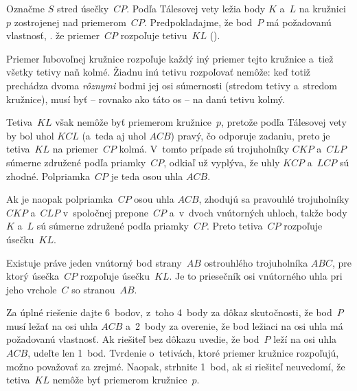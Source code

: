 {%
Označme $S$ stred úsečky~$CP$. Podľa Tálesovej vety ležia body $K$ a~$L$ na kružnici~$p$ zostrojenej nad priemerom~$CP$. Predpokladajme, že bod~$P$ má požadovanú vlastnosť, \tj. že priemer~$CP$ rozpoľuje tetivu~$KL$ (\obr).
%

Priemer ľubovoľnej kružnice rozpoľuje každý iný priemer tejto kružnice a~tiež všetky tetivy naň kolmé. Žiadnu inú tetivu rozpoľovať nemôže: keď totiž prechádza dvoma {\it rôznymi} bodmi jej osi súmernosti (stredom tetivy a~stredom kružnice), musí byť -- rovnako ako táto os -- na danú tetivu kolmý.

Tetiva~$KL$ však nemôže byť priemerom kružnice~$p$, pretože podľa Tálesovej vety by bol uhol $KCL$ (a~teda aj uhol $ACB$) pravý, čo odporuje zadaniu, preto je tetiva~$KL$ na priemer~$CP$ kolmá. V~tomto prípade sú trojuholníky $CKP$ a~$CLP$ súmerne združené podľa priamky~$CP$, odkiaľ už vyplýva, že uhly $KCP$ a~$LCP$ sú zhodné. Polpriamka~$CP$ je teda osou uhla $ACB$.

Ak je naopak polpriamka~$CP$ osou uhla $ACB$, zhodujú sa pravouhlé trojuholníky $CKP$ a~$CLP$ v~spoločnej prepone~$CP$ a~v~dvoch vnútorných uhloch, takže body $K$ a~$L$ sú súmerne združené podľa priamky~$CP$. Preto tetiva~$CP$ rozpoľuje úsečku~$KL$.

\odpoved
Existuje práve jeden vnútorný bod strany~$AB$ ostrouhlého trojuholníka $ABC$, pre ktorý úsečka~$CP$ rozpoľuje úsečku~$KL$. Je to priesečník osi vnútorného uhla pri jeho vrchole~$C$ so stranou~$AB$.

\nobreak\medskip\petit\noindent
Za úplné riešenie dajte 6~bodov, z~toho 4~body za dôkaz skutočnosti, že bod~$P$ musí ležať na osi uhla $ACB$ a~2~body za overenie, že bod ležiaci na osi uhla má požadovanú vlastnosť. Ak riešiteľ bez dôkazu uvedie, že bod~$P$ leží na osi uhla $ACB$, udeľte len 1~bod. Tvrdenie o~tetivách, ktoré priemer kružnice rozpoľujú, možno považovať za zrejmé. Naopak, strhnite 1~bod, ak si riešiteľ neuvedomí, že tetiva~$KL$ nemôže byť priemerom kružnice~$p$.

\endpetit
\bigbreak}

